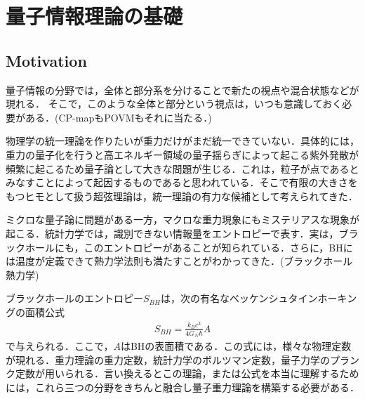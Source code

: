 \chapter{量子情報理論の基礎}
\section{Motivation}
量子情報の分野では，全体と部分系を分けることで新たの視点や混合状態などが現れる．
そこで，このような全体と部分という視点は，いつも意識しておく必要がある．(CP-mapもPOVMもそれに当たる．)

物理学の統一理論を作りたいが重力だけがまだ統一できていない．具体的には，重力の量子化を行うと高エネルギー領域の量子揺らぎによって起こる紫外発散が頻繁に起こるため量子論として大きな問題が生じる．これは，粒子が点であるとみなすことによって起因するものであると思われている．そこで有限の大きさをもつヒモとして扱う超弦理論は，統一理論の有力な候補として考えられてきた．

ミクロな量子論に問題がある一方，マクロな重力現象にもミステリアスな現象が起こる．統計力学では，識別できない情報量をエントロピーで表す．実は，ブラックホールにも，このエントロピーがあることが知られている．さらに，BHには温度が定義できて熱力学法則も満たすことがわかってきた．(ブラックホール熱力学)

ブラックホールのエントロピー$S_{BH}$は，次の有名なベッケンシュタインホーキングの面積公式
\begin{align}
  S_{BH}=\frac{k_{B}c^3}{4G_{N}\hbar}A
\end{align}
で与えられる．ここで，$A$はBHの表面積である．この式には，様々な物理定数が現れる．重力理論の重力定数，統計力学のボルツマン定数，量子力学のプランク定数が用いられる．言い換えるとこの理論，または公式を本当に理解するためには，これら三つの分野をきちんと融合し量子重力理論を構築する必要がある．

